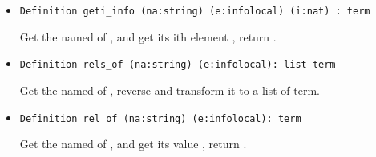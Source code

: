 \documentclass[a4paper,UKenglish,cleveref, autoref, thm-restate]{lipics-v2021}
\begin{document}
\begin{itemize}
\item
\begin{lstlisting}[language = {Coq}, basicstyle = \small]
Definition geti_info (na:string) (e:infolocal) (i:nat) : term
\end{lstlisting}
Get the  named  of , and get its ith element , return .


\item
\begin{lstlisting}[language = {Coq}, basicstyle = \small]
Definition rels_of (na:string) (e:infolocal): list term
\end{lstlisting}
Get the  named  of , reverse and transform it to a 
list of  term.


\item
\begin{lstlisting}[language = {Coq}, basicstyle = \small]
Definition rel_of (na:string) (e:infolocal): term
\end{lstlisting}
Get the  named  of , and get its value , return .








\end{itemize}
\end{document}
